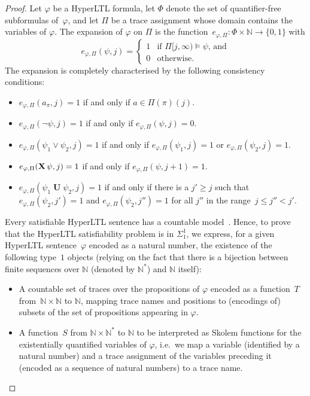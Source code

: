 \documentclass[dvipsnames,10pt,a4paper]{amsart}
\theoremstyle{definition}
\theoremstyle{remark}
\newcommand{\expansion}{e}
\newcommand{\set}[1]{\{#1\}}
\newcommand{\nats}{\mathbb{N}}
\DeclareMathOperator{\U}{\mathbf{U}}
\newcommand{\X}{\mathop{\mathbf{X}\vphantom{a}}\nolimits}
\newcommand{\hyltl}{{HyperLTL}\xspace}
\newcommand{\suffix}[2]{#1[#2,\infty)}
\begin{document}
\begin{proof}
Let $\varphi$ be a \hyltl formula, let $\Phi$ denote the set of quantifier-free subformulas of~$\varphi$, and let $\Pi$ be a trace assignment whose domain contains the variables of $\varphi$. The expansion of $\varphi$ on $\Pi$ is the function~$\expansion_{\varphi, \Pi} \colon \Phi \times \nats \rightarrow \set{0,1}$ with
\[
\expansion_{\varphi, \Pi}(\psi, j)= \begin{cases}
1 &\text{if $\suffix{\Pi}{j} \models \psi$, and}\\
0 &\text{otherwise.}
\end{cases} 
\]
The expansion is completely characterised by the following consistency conditions:
\begin{itemize}
	\item $\expansion_{\varphi, \Pi} (a_\pi,j)=1$ if and only if $a \in \Pi(\pi)(j)$.
	\item $\expansion_{\varphi, \Pi} (\neg \psi,j)=1$ if and only if  $\expansion_{\varphi, \Pi} (\psi,j)=0$.
	\item $\expansion_{\varphi, \Pi} (\psi_1 \vee \psi_2,j)=1$ if and only if $\expansion_{\varphi, \Pi} (\psi_1,j)=1$ or $\expansion_{\varphi, \Pi} (\psi_2,j)=1$.
	\item $\expansion_{\varphi, \Pi} (\X\psi,j)=1$ if and only if $\expansion_{\varphi, \Pi} (\psi,j+1)=1$.
	\item $\expansion_{\varphi, \Pi} (\psi_1 \U \psi_2,j)=1$ if and only if there is a $j' \ge j$ such that $\expansion_{\varphi, \Pi} (\psi_2,j')=1$ and $\expansion_{\varphi, \Pi} (\psi_2,j'')=1$ for all $j''$ in the range~$j \le j'' < j'$.
\end{itemize}

Every satisfiable \hyltl sentence has a countable model~\cite{FZ17}.
Hence, to prove that the \hyltl satisfiability problem is in $\Sigma_1^1$, we express, for a given \hyltl sentence~$\varphi$ encoded as a natural number, the existence of the following type~$1$ objects (relying on the fact that there is a bijection between finite sequences over $\nats$ (denoted by $\nats^*$) and $\nats$ itself):
\begin{itemize}

	\item A countable set of traces over the propositions of $\varphi$ encoded as a function~$T$ from~$\nats \times \nats$ to $\nats$, mapping trace names and positions to (encodings of) subsets of the set of propositions appearing in $\varphi$.
	
	\item A function~$S$ from $\nats \times \nats^*$ to $\nats$ to be interpreted as Skolem functions for the existentially quantified variables of $\varphi$, i.e.\ we map a variable (identified by a natural number) and a trace assignment of the variables preceding it (encoded as a sequence of natural numbers) to a trace name.


\end{itemize}
\end{proof}
\end{document}
